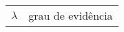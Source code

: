\thispagestyle{empty}
\begin{longtable}[l]{p{50pt} p{200pt}}
  $\lambda $ & grau de evidência \\
\end{longtable}
